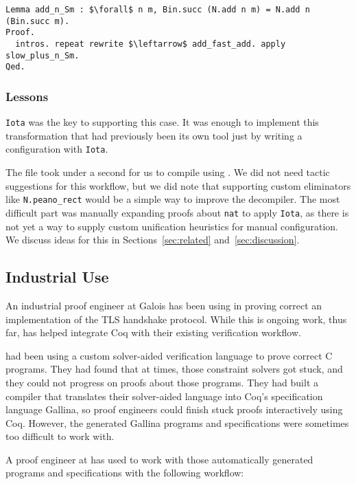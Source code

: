 \begin{lstlisting}
Lemma add_n_Sm : $\forall$ n m, Bin.succ (N.add n m) = N.add n (Bin.succ m).
Proof.
  intros. repeat rewrite $\leftarrow$ add_fast_add. apply slow_plus_n_Sm.
Qed.
\end{lstlisting}

\subsubsection{Lessons}

\lstinline{Iota} was the key to supporting this case.
It was enough to implement this transformation that had previously been its own tool
just by writing a configuration with \lstinline{Iota}. 

The file took under a second for us to compile using \toolname.
We did not need tactic suggestions for this workflow,
but we did note that supporting custom eliminators like \lstinline{N.peano_rect} would be a simple way
to improve the decompiler.
The most difficult part was manually expanding proofs about \lstinline{nat}
to apply \lstinline{Iota},
as there is not yet a way to supply custom unification heuristics for manual configuration.
We discuss ideas for this in Sections~\ref{sec:related} and~\ref{sec:discussion}.

\subsection{Industrial Use}
\label{sec:industry}

An industrial proof engineer at Galois has been using \toolname in proving
correct an implementation of the TLS handshake protocol.
While this is ongoing work, thus far,
\toolname has helped \company integrate Coq with their existing verification workflow.

\company had been using a custom solver-aided verification language to prove correct C programs.
They had found that at times, those constraint solvers got stuck, and they could not
progress on proofs about those programs.
They had built a compiler that translates their solver-aided language into Coq's specification language Gallina,
so proof engineers could finish stuck proofs interactively using Coq.
However, the generated Gallina programs and specifications were sometimes too difficult to work with.

A proof engineer at \company has used \toolname to work with those automatically generated programs and specifications
with the following workflow:

